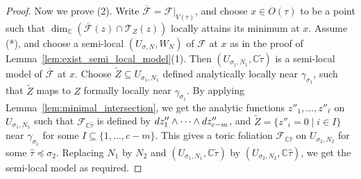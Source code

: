 \documentclass[12pt,reqno]{amsart}
\theoremstyle{definition}
\newcommand\cF{{\mathcal{F}}}
\newcommand\cT{{\mathcal{T}}}
\newcommand\bC{{\mathbb C}}
\newcommand{\diff}{\textnormal{d}}
\begin{document}
\begin{proof}
    Now we prove (2). 
    Write $\overline\cF=\cF\vert_{V(\tau)}$, and choose $x\in O(\tau)$ to be a point such that $\dim_\bC(\overline\cF(z)\cap \cT_Z(z))$ locally attains its minimum at $x$. Assume (*), and choose a semi-local $(U_{\sigma,N},W_N)$ of $\cF$ at $x$ as in the proof of Lemma~\ref{lem:exist_semi_local_model}(1). Then $(U_{\sigma_1,N_1},\bC\widetilde\tau)$ is a semi-local model of $\overline\cF$ at $x$. Choose $\widetilde Z \subseteq U_{\sigma_1,N_1}$ defined analytically locally near $\gamma_{\sigma_1}$, such that $\widetilde Z$ maps to $Z$ formally locally near $\gamma_{\sigma_1}$. By applying Lemma~\ref{lem:minimal_intersection}, we get the analytic functions $z''_1,\ldots,z''_\ell$ on $U_{\sigma_1,N_1}$ such that $\cF_{\bC \widetilde\tau}$ is defined by $\diff z''_1\wedge\cdots\wedge\diff z''_{c-m}$, and $\widetilde Z=\{z''_i=0\mid i\in I\}$ near $\gamma_{\sigma_1}$ for some $I\subseteq\{1,\ldots,c-m\}$. This gives a toric foliation $\cF_{\bC\widehat\tau}$ on $U_{\sigma_2,N_2}$ for some $\widehat\tau\preceq\sigma_2$. Replacing $N_1$ by $N_2$ and  $(U_{\sigma_1,N_1},\bC\widetilde\tau)$ by $(U_{\sigma_2,N_2},\bC\widehat\tau)$, we get the semi-local model as required.
\end{proof}
\end{document}
